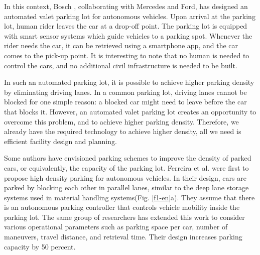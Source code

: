 In this context, Bosch , collaborating with Mercedes and Ford, has designed an automated valet parking lot for autonomous vehicles. Upon arrival at the parking lot, human rider leaves the car at a drop-off point. The parking lot is equipped with smart sensor systems which guide vehicles to a parking spot. Whenever the rider needs the car, it can be retrieved using a smartphone app, and the car comes to the pick-up point. It is interesting to note that no human is needed to control the cars, and no additional civil infrastructure is needed to be built. 

In such an automated parking lot, it is possible to achieve higher parking density by eliminating driving lanes. In a common parking lot, driving lanes cannot be blocked for one simple reason: a blocked car might need to leave before the car that blocks it. However, an automated valet parking lot creates an opportunity to overcome this problem, and to achieve higher parking density. Therefore, we already have the required technology to achieve higher density, all we need is efficient facility design and planning. 


Some authors have envisioned parking schemes to improve the density of parked cars, or equivalently, the capacity of the parking lot. Ferreira et al. were first to propose high density parking for autonomous vehicles. In their design, cars are parked by blocking each other in parallel lanes, similar to the deep lane storage systems used in material handling systems(Fig. \ref{f1-en}a). They assume that there is an autonomous parking controller that controls vehicle mobility inside the parking lot. The same group of researchers has extended this work to consider various operational parameters such as parking space per car, number of maneuvers, travel distance, and retrieval time. Their design increases parking capacity by 50 percent.

